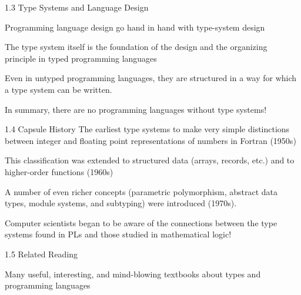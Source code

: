 \documentclass[table]{beamer}
\begin{document}
\begin{frame}[t]{1.3 Type Systems and Language Design} \vspace{10pt}

Programming language design go hand in hand with type-system design

\vspace{10pt}

The type system itself is the foundation of the design and the organizing principle in typed programming languages

\vspace{10pt}

Even in untyped programming languages, they are structured in a way for which a type system can be written.

\vspace{10pt}

In summary, there are no programming languages without type systems!

%

\end{frame}

\begin{frame}[t]{1.4 Capsule History} \vspace{10pt}
The earliest type systems to make very simple distinctions between integer and floating point representations of numbers in Fortran (1950s)

\vspace{10pt}

This classification was extended to structured data (arrays, records, etc.) and to higher-order functions (1960s)

\vspace{10pt}

A number of even richer concepts (parametric polymorphism, abstract data types, module systems, and subtyping) were introduced (1970s).

\vspace{10pt}

Computer scientists began to be aware of the connections between the type systems found in PLs and those studied in mathematical logic! 

\end{frame}

\begin{frame}[t]{1.5 Related Reading} \vspace{10pt}

Many useful, interesting, and mind-blowing textbooks about types and programming languages 

\end{frame}
\end{document}

